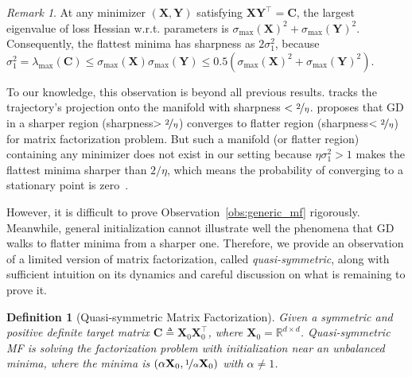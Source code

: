 \documentclass{article}
\newcommand{\citet}[1]{\cite{#1}}
\newcommand{\citep}[1]{\cite{#1}}
\theoremstyle{plain}
\newtheorem{defi}{Definition}
\theoremstyle{remark}
\newtheorem*{remark}{Remark}
\def\R{\mathbb{R}}
\def\bC{\mathbf{C}}
\def\bX{\mathbf{X}}
\def\bY{\mathbf{Y}}
\newcommand{\cbb}[1]{\noindent{\color{blue}{#1}}}  %
\begin{document}
\begin{remark}
    At any minimizer $(\bX,\bY)$ satisfying $\bX\bY^\top=\bC$, the largest eigenvalue of loss Hessian w.r.t. parameters is $\sigma_{\max}(\bX)^2+\sigma_{\max}(\bY)^2$. Consequently, the flattest minima has sharpness as $2\sigma_1^2$, because $\sigma_1^2=\lambda_{\max}(\bC)\le \sigma_{\max}(\bX)\sigma_{\max}(\bY)\le 0.5\left(\sigma_{\max}(\bX)^2+\sigma_{\max}(\bY)^2\right)$.
\end{remark}


To our knowledge, this observation is beyond all previous results. \citet{damian2022self} tracks the trajectory's projection onto the manifold with sharpness $<\nicefrac{2}{\eta}$. \citet{wang2021large} proposes that GD in a sharper region (sharpness$>\nicefrac{2}{\eta}$) converges to flatter region (sharpness$<\nicefrac{2}{\eta}$) for matrix factorization problem. But such a manifold (or flatter region) containing any minimizer does not exist in our setting because $\eta\sigma_1^2>1$ makes the flattest minima sharper than $2/\eta$, which means the probability of converging to a stationary point is zero~\citep{ahn2022understanding}.

However, it is difficult to prove Observation~\ref{obs:generic_mf} rigorously. Meanwhile, general initialization cannot illustrate well the phenomena that GD walks to flatter minima from a sharper one. Therefore, we provide an observation of a limited version of matrix factorization, called \textit{quasi-symmetric}, along with sufficient intuition on its dynamics and careful discussion on what is remaining to prove it.

\begin{defi}[Quasi-symmetric Matrix Factorization]
Given a symmetric and positive definite target matrix $\bC\triangleq\bX_0\bX_0^\top$, where $\bX_0=\R^{d\times d}$. Quasi-symmetric MF is solving the factorization problem with initialization near an unbalanced minima, where the minima is $(\alpha \bX_0, \nicefrac{1}{\alpha} \bX_0)$ with $\alpha\neq 1$.
\end{defi}

\end{document}
